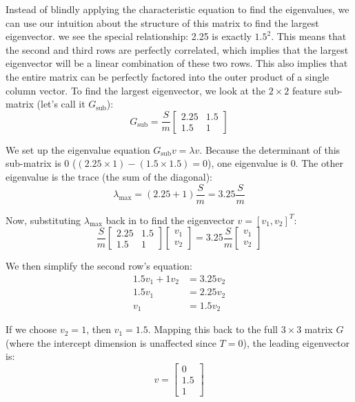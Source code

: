 \documentclass[twoside, 10pt]{article}
\begin{document}
Instead of blindly applying the characteristic equation to find the eigenvalues, we can use our intuition about the structure of this matrix to find the largest eigenvector. we see the special relationship: 2.25 is exactly $1.5^2$. This means that the second and third rows are perfectly correlated, which implies that the largest eigenvector will be a linear combination of these two rows.
This also implies that the entire matrix can be perfectly factored into the outer product of a single column vector. To find the largest eigenvector, we look at the $2 \times 2$ feature sub-matrix (let's call it $G_{\text{sub}}$):
\[
G_{\text{sub}} = \frac{S}{m} \begin{bmatrix} 2.25 & 1.5 \\ 1.5 & 1 \end{bmatrix}
\]

We set up the eigenvalue equation $G_{\text{sub}} v = \lambda v$. Because the determinant of this sub-matrix is $0$ ($(2.25 \times 1) - (1.5 \times 1.5) = 0$), one eigenvalue is $0$. The other eigenvalue is the trace (the sum of the diagonal): 
\[
\lambda_{\max} = (2.25 + 1)\frac{S}{m} = 3.25\frac{S}{m}
\]

Now, substituting $\lambda_{\max}$ back in to find the eigenvector $v = [v_1, v_2]^T$:
\[
\frac{S}{m} \begin{bmatrix} 2.25 & 1.5 \\ 1.5 & 1 \end{bmatrix} \begin{bmatrix} v_1 \\ v_2 \end{bmatrix} = 3.25\frac{S}{m} \begin{bmatrix} v_1 \\ v_2 \end{bmatrix}
\]

We then simplify the second row's equation:
\begin{align*}
1.5v_1 + 1v_2 &= 3.25v_2 \\
1.5v_1 &= 2.25v_2 \\
v_1 &= 1.5v_2
\end{align*}

If we choose $v_2 = 1$, then $v_1 = 1.5$. Mapping this back to the full $3 \times 3$ matrix $G$ (where the intercept dimension is unaffected since $T=0$), the leading eigenvector is:
\[
v = \begin{bmatrix} 0 \\ 1.5 \\ 1 \end{bmatrix}
\]
\end{document}
